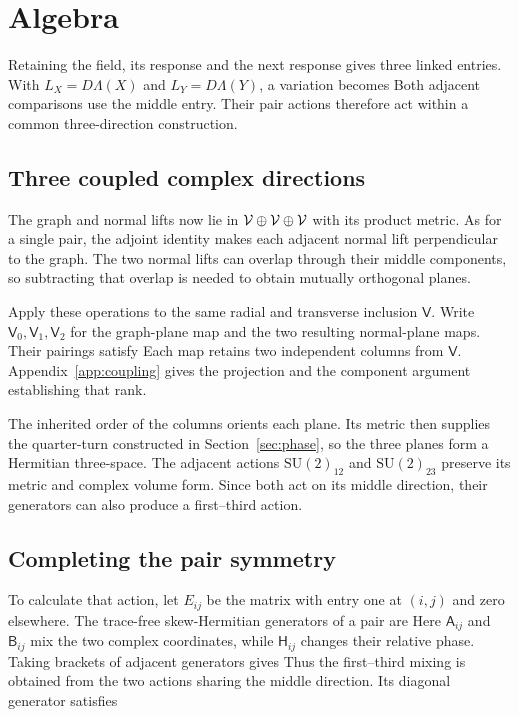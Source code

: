 \section{Algebra}
\label{sec:color}
Retaining the field, its response and the next response gives three linked entries. With $L_X=D\Lambda(X)$ and $L_Y=D\Lambda(Y)$, a variation becomes
\AlgebraThreeLevelVariationDisplay
Both adjacent comparisons use the middle entry. Their pair actions therefore act within a common three-direction construction.

\subsection{Three coupled complex directions}
The graph and normal lifts now lie in ${\mathcal V}\oplus {\mathcal V}\oplus {\mathcal V}$ with its product metric. As for a single pair, the adjoint identity makes each adjacent normal lift perpendicular to the graph. The two normal lifts can overlap through their middle components, so subtracting that overlap is needed to obtain mutually orthogonal planes.

Apply these operations to the same radial and transverse inclusion $\mathsf V$. Write $\mathsf V_0,\mathsf V_1,\mathsf V_2$ for the graph-plane map and the two resulting normal-plane maps. Their pairings satisfy
\AlgebraJointOrthogonalityDisplay
Each map retains two independent columns from $\mathsf V$. Appendix~\ref{app:coupling} gives the projection and the component argument establishing that rank.

The inherited order of the columns orients each plane. Its metric then supplies the quarter-turn constructed in Section~\ref{sec:phase}, so the three planes form a Hermitian three-space. The adjacent actions $\mathrm{SU}(2)_{12}$ and $\mathrm{SU}(2)_{23}$ preserve its metric and complex volume form. Since both act on its middle direction, their generators can also produce a first--third action.

\subsection{Completing the pair symmetry}
To calculate that action, let $E_{ij}$ be the matrix with entry one at $(i,j)$ and zero elsewhere. The trace-free skew-Hermitian generators of a pair are
\AlgebraGeneratorDefinitionDisplay
Here $\mathsf A_{ij}$ and $\mathsf B_{ij}$ mix the two complex coordinates, while $\mathsf H_{ij}$ changes their relative phase. Taking brackets of adjacent generators gives
\AlgebraCrossPairDisplay
Thus the first--third mixing is obtained from the two actions sharing the middle direction. Its diagonal generator satisfies
\AlgebraDiagonalDependenceDisplay


